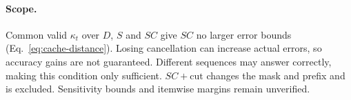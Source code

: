 \paragraph{Scope.}
Common valid $\kappa_t$ over $D$, $S$ and $SC$ give $SC$ no larger error
bounds (Eq.~\eqref{eq:cache-distance}). Losing cancellation can increase
actual errors, so accuracy gains are not guaranteed. Different sequences
may answer correctly, making this condition only sufficient.
$SC+\mathrm{cut}$ changes the mask and prefix and is excluded.
Sensitivity bounds and itemwise margins remain unverified.
